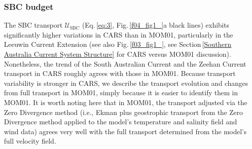 \documentclass[preprint,3p,review,12pt]{elsarticle}
\newcommand{\sub}[1]{_{\text{#1}}}
\begin{document}
\subsubsection{SBC budget}\label{SBC budget}
The SBC transport $\mathcal{U}\sub{SBC}$ (Eq.\,\ref{eq:3}, Fig.\,\ref{f04_fig1_}a black lines) exhibits significantly higher variations in CARS than in MOM01, particularly in the Leeuwin Current Extension (see also Fig.\,\ref{f03_fig1_}, see Section\,\ref{Southern Australia Current System Structure} for CARS versus MOM01 discussion). Nonetheless, the trend of the South Australian Current and the Zeehan Current transport in CARS roughly agrees with those in MOM01. Because transport variability is stronger in CARS, we describe the transport evolution and changes from full transport in MOM01, simply because it is easier to identify them in MOM01. It is worth noting here that in MOM01, the transport adjusted via the Zero Divergence method (i.e., Ekman plus geostrophic transport from the Zero Divergence method applied to the model's temperature and salinity field and wind data) agrees very well with the full transport determined from the model's full velocity field. 
\end{document}
